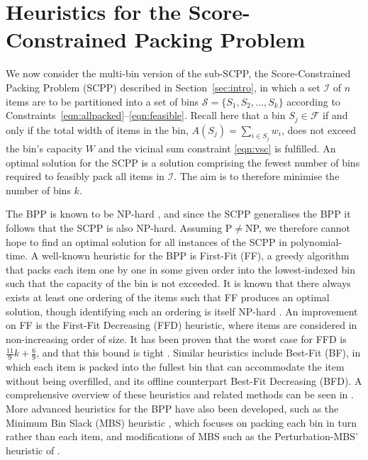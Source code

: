 \documentclass[a4paper,11pt,authoryear]{elsarticle}
\begin{document}

\section{Heuristics for the Score-Constrained Packing Problem}
\label{sec:heur}

\noindent We now consider the multi-bin version of the sub-SCPP, the Score-Constrained Packing Problem (SCPP) described in Section~\ref{sec:intro}, in which a set $\mathcal{I}$ of $n$ items are to be partitioned into a set of bins $\mathcal{S} = \{S_1, S_2,\dotsc,S_k\}$ according to Constraints~\eqref{eqn:allpacked}--\eqref{eqn:feasible}. Recall here that a bin $S_j \in \mathcal{F}$ if and only if the total width of items in the bin, $A(S_j) = \sum_{i \in S_j} w_i$, does not exceed the bin's capacity $W$ and the vicinal sum constraint \eqref{eqn:vsc} is fulfilled. An optimal solution for the SCPP is a solution comprising the fewest number of bins required to feasibly pack all items in $\mathcal{I}$. The aim is to therefore minimise the number of bins $k$.

The BPP is known to be NP-hard \citep{garey1979}, and since the SCPP generalises the BPP it follows that the SCPP is also NP-hard. Assuming P$\neq$NP, we therefore cannot hope to find an optimal solution for all instances of the SCPP in polynomial-time. A well-known heuristic for the BPP is First-Fit (FF), a greedy algorithm that packs each item one by one in some given order into the lowest-indexed bin such that the capacity of the bin is not exceeded. It is known that there always exists at least one ordering of the items such that FF produces an optimal solution, though identifying such an ordering is itself NP-hard \citep{lewis2009}. An improvement on FF is the First-Fit Decreasing (FFD) heuristic, where items are considered in non-increasing order of size. It has been proven that the worst case for FFD is $\frac{11}{9}k + \frac{6}{9}$, and that this bound is tight \citep{dosa2007}. Similar heuristics include Best-Fit (BF), in which each item is packed into the fullest bin that can accommodate the item without being overfilled, and its offline counterpart Best-Fit Decreasing (BFD). A comprehensive overview of these heuristics and related methods can be seen in \cite{coffman1984}. More advanced heuristics for the BPP have also been developed, such as the Minimum Bin Slack (MBS) heuristic \citep{gupta1999}, which focuses on packing each bin in turn rather than each item, and modifications of MBS such as the Perturbation-MBS' heuristic of \cite{fleszar2002}.
\end{document}
